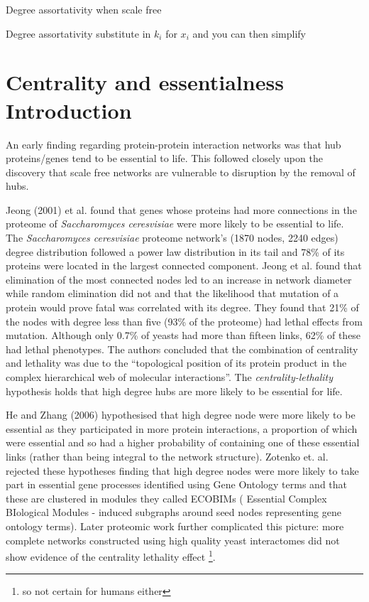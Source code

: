 Degree assortativity when scale free

Degree assortativity substitute in $k_i$ for $x_i$ and you can then simplify
\section{Centrality and essentialness Introduction}
\label{sec:Degree and essentialness}
An early finding regarding protein-protein interaction networks was that hub proteins/genes tend to be essential to life. This followed closely upon the discovery that scale free networks are vulnerable to disruption by the removal of hubs\cite{albert2000error}.

Jeong (2001) \cite{jeong2001lethality} et al. found that genes whose proteins had more connections in the proteome of \textit{Saccharomyces ceresvisiae} were more likely to be essential to life. The  \textit{Saccharomyces ceresvisiae} proteome network's (1870 nodes, 2240 edges) degree distribution followed a power law distribution in its tail and 78\% of its proteins were located in the largest connected component. Jeong et al. found that elimination of the most connected nodes led to an increase in network diameter while random elimination did not and that the likelihood that mutation of a protein would prove fatal was correlated with its degree. They found that 21\% of the nodes with degree less than five (93\% of the proteome) had lethal effects from mutation. Although only 0.7\% of yeasts had more than fifteen links,  62\% of these had lethal phenotypes. The authors \cite{jeong2001lethality} concluded that the combination of centrality and lethality was due to the ``topological position of its protein product in the complex hierarchical web of molecular interactions''. The \textit{centrality-lethality} hypothesis holds that high degree hubs are more likely to be essential for life\cite{zotenko2008hubs}. 

He and Zhang (2006)\cite{he2006hubs} hypothesised that high degree node were more likely to be essential as they participated in more protein interactions, a proportion of which were essential and so had a higher probability of containing one of these essential links (rather than being integral to the network structure). Zotenko et. al. \cite{zotenko2008hubs} rejected these hypotheses finding that high degree nodes were more likely to take part in essential gene processes identified using Gene Ontology terms and that these are clustered in modules they called ECOBIMs ( Essential Complex BIological Modules - induced subgraphs around seed nodes representing gene ontology terms).  
Later proteomic work further complicated this picture: more complete networks constructed using high quality yeast interactomes did not show evidence of the centrality lethality effect\cite{milenkovic2011dominating} \cite{yu2008high} \cite{ratmann2009evidence}\footnote{so not certain for humans either}. 

